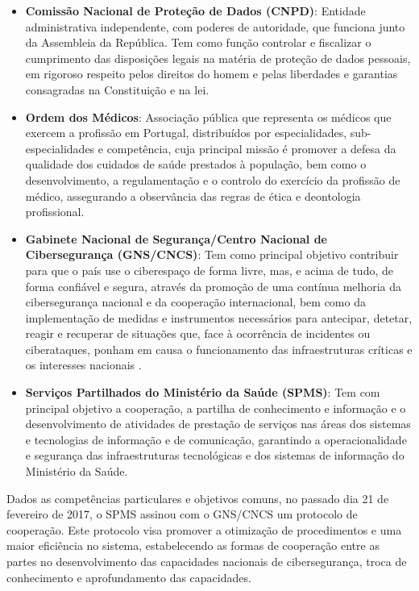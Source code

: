 \documentclass[conference]{IEEEtran}
\begin{document}
\begin{itemize}

	\item \textbf{Comissão Nacional de Proteção de Dados (CNPD)}: Entidade administrativa independente, com poderes de autoridade, que funciona junto da Assembleia da República. Tem como função controlar e fiscalizar o cumprimento das disposições legais na matéria de proteção de dados pessoais, em rigoroso respeito pelos direitos do homem e pelas liberdades e garantias consagradas na Constituição e na lei.
	
	\item \textbf{Ordem dos Médicos}: Associação pública que representa os médicos que exercem a profissão em Portugal, distribuídos por especialidades, sub-especialidades e competência, cuja principal missão é promover a defesa da qualidade dos cuidados de saúde prestados à população, bem como o desenvolvimento, a regulamentação e o controlo do exercício da profissão de médico, assegurando a observância das regras de ética e deontologia profissional.
	
	\item \textbf{Gabinete Nacional de Segurança/Centro Nacional de Cibersegurança (GNS/CNCS)}: Tem como principal objetivo contribuir para que o país use o ciberespaço de forma livre, mas, e acima de tudo, de forma confiável e segura, através da promoção de uma contínua melhoria da cibersegurança nacional e da cooperação internacional, bem como da implementação de medidas e instrumentos necessários para antecipar, detetar, reagir e recuperar de situações que, face à ocorrência de incidentes ou ciberataques, ponham em causa o funcionamento das infraestruturas críticas e os interesses nacionais \cite{colabCNCS_SPMS}.
	
	\item \textbf{Serviços Partilhados do Ministério da Saúde (SPMS)}: Tem com principal objetivo a cooperação, a partilha de conhecimento e informação e o desenvolvimento de atividades de prestação de serviços nas áreas dos sistemas e tecnologias de informação e de comunicação, garantindo a operacionalidade e segurança das infraestruturas tecnológicas e dos sistemas de informação do Ministério da Saúde.

\end{itemize}

Dados as competências particulares e objetivos comuns, no passado dia 21 de fevereiro de 2017, o SPMS assinou com o GNS/CNCS um protocolo de cooperação. Este protocolo visa promover a otimização de procedimentos e uma maior eficiência no sistema, estabelecendo as formas de cooperação entre as partes no desenvolvimento das capacidades nacionais de cibersegurança, troca de conhecimento e aprofundamento das capacidades.
\end{document}

